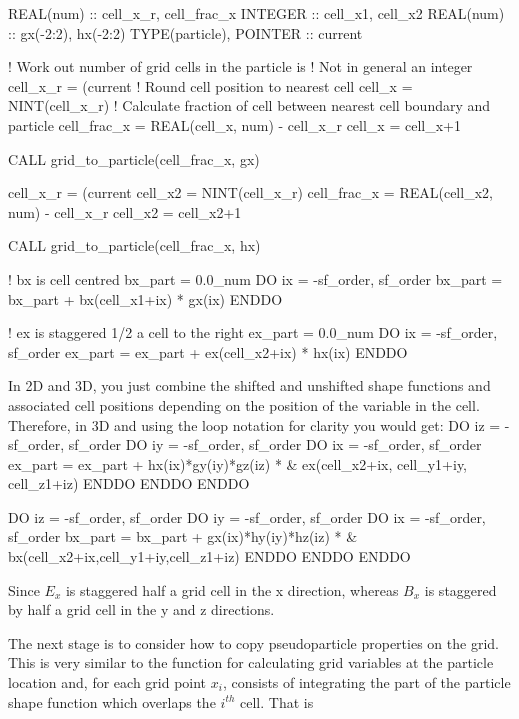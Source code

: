 \documentclass[12pt,a4paper]{article}
\newenvironment{boxverbatim}{\lboxverbatim{none}}{\endlboxverbatim}
\begin{document}
\begin{boxverbatim}
  REAL(num) :: cell_x_r, cell_frac_x
  INTEGER :: cell_x1, cell_x2
  REAL(num) :: gx(-2:2), hx(-2:2)
  TYPE(particle), POINTER :: current

  ! Work out number of grid cells in the particle is
  ! Not in general an integer
  cell_x_r = (current%
  ! Round cell position to nearest cell
  cell_x = NINT(cell_x_r)
  ! Calculate fraction of cell between nearest cell boundary and particle
  cell_frac_x = REAL(cell_x, num) - cell_x_r
  cell_x = cell_x+1

  CALL grid_to_particle(cell_frac_x, gx)

  cell_x_r = (current%
  cell_x2  = NINT(cell_x_r)
  cell_frac_x = REAL(cell_x2, num) - cell_x_r
  cell_x2 = cell_x2+1

  CALL grid_to_particle(cell_frac_x, hx)

  ! bx is cell centred
  bx_part = 0.0_num
  DO ix = -sf_order, sf_order
    bx_part = bx_part + bx(cell_x1+ix) * gx(ix)
  ENDDO

  ! ex is staggered 1/2 a cell to the right
  ex_part = 0.0_num
  DO ix = -sf_order, sf_order
    ex_part = ex_part + ex(cell_x2+ix) * hx(ix)
  ENDDO
\end{boxverbatim}

In 2D and 3D, you just combine the shifted and unshifted shape functions and
associated cell positions depending on the position of the variable in the
cell. Therefore, in 3D and using the loop notation for clarity you would get:
\begin{boxverbatim}
  DO iz = -sf_order, sf_order
    DO iy = -sf_order, sf_order
      DO ix = -sf_order, sf_order
        ex_part = ex_part + hx(ix)*gy(iy)*gz(iz) * &
            ex(cell_x2+ix, cell_y1+iy, cell_z1+iz)
      ENDDO
    ENDDO
  ENDDO

  DO iz = -sf_order, sf_order
    DO iy = -sf_order, sf_order
      DO ix = -sf_order, sf_order
        bx_part = bx_part + gx(ix)*hy(iy)*hz(iz) * &
            bx(cell_x2+ix,cell_y1+iy,cell_z1+iz)
      ENDDO
    ENDDO
  ENDDO
\end{boxverbatim}

Since $E_x$ is staggered half a grid cell in the x direction, whereas $B_x$ is
staggered by half a grid cell in the y and z directions.

The next stage is to consider how to copy pseudoparticle
properties on the grid. This is very similar to the function for calculating
grid variables at the particle location and, for each grid point $x_i$,
consists of integrating the part of the particle shape function which overlaps
the $i^{th}$ cell. That is
\end{document}
